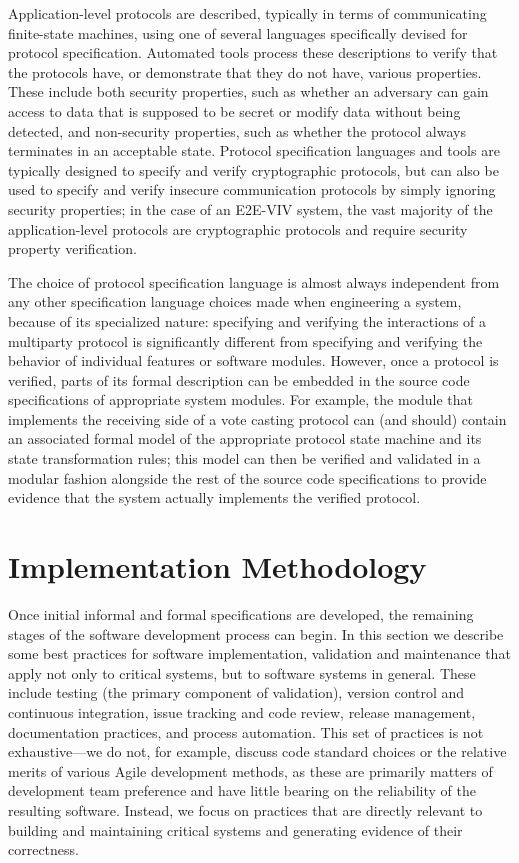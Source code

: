 Application-level protocols are described, typically in terms of
communicating finite-state machines, using one of several languages
specifically devised for protocol specification. Automated tools
process these descriptions to verify that the protocols have, or
demonstrate that they do not have, various properties. These include
both security properties, such as whether an adversary can gain access
to data that is supposed to be secret or modify data without being
detected, and non-security properties, such as whether the protocol
always terminates in an acceptable state. Protocol specification
languages and tools are typically designed to specify and verify
cryptographic protocols, but can also be used to specify and verify
insecure communication protocols by simply ignoring security
properties; in the case of an E2E-VIV system, the vast majority of the
application-level protocols are cryptographic protocols and require
security property verification.

The choice of protocol specification language is almost always
independent from any other specification language choices made when
engineering a system, because of its specialized nature: specifying
and verifying the interactions of a multiparty protocol is
significantly different from specifying and verifying the behavior of
individual features or software modules. However, once a protocol is
verified, parts of its formal description can be embedded in the
source code specifications of appropriate system modules. For example,
the module that implements the receiving side of a vote casting
protocol can (and should) contain an associated formal model of the
appropriate protocol state machine and its state transformation rules;
this model can then be verified and validated in a modular fashion
alongside the rest of the source code specifications to provide
evidence that the system actually implements the verified protocol.

\section{Implementation Methodology}

Once initial informal and formal specifications are developed, the
remaining stages of the software development process can begin. In
this section we describe some best practices for software
implementation, validation and maintenance that apply not only to
critical systems, but to software systems in general. These include
testing (the primary component of validation), version control and
continuous integration, issue tracking and code review, release
management, documentation practices, and process automation. This set
of practices is not exhaustive---we do not, for example, discuss code
standard choices or the relative merits of various Agile development
methods, as these are primarily matters of development team preference
and have little bearing on the reliability of the resulting
software. Instead, we focus on practices that are directly relevant to
building and maintaining critical systems and generating evidence of
their correctness.

